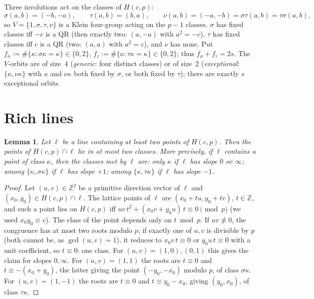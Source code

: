 \documentclass[11pt]{article}
\newtheorem{lemma}[theorem]{Lemma}
\theoremstyle{remark}
\newcommand{\Z}{\mathbb{Z}}
\newcommand{\Hc}{H(c,p)}
\begin{document}
Three involutions act on the classes of $\Hc$:
\[
 \sigma(a,b)=(-b,-a),\qquad \tau(a,b)=(b,a),\qquad \nu(a,b)=(-a,-b)=\sigma\tau(a,b)=\tau\sigma(a,b),
\]
so $V=\{1,\sigma,\tau,\nu\}$ is a Klein four-group acting on the $p-1$ classes.  $\sigma$ has fixed classes iff $-c$ is a
QR (then exactly two: $(a,-a)$ with $a^2=-c$), $\tau$ has fixed classes iff $c$ is a QR (two: $(a,a)$ with $a^2=c$),
and $\nu$ has none.  Put $f_\sigma:=\#\{\kappa:\sigma\kappa=\kappa\}\in\{0,2\}$, $f_\tau:=\#\{\kappa:\tau\kappa=\kappa\}\in\{0,2\}$;
thus $f_\sigma+f_\tau=2s$.  The $V$-orbits are of size~4 (\emph{generic}: four distinct classes) or of size~2
(\emph{exceptional}: $\{\kappa,\nu\kappa\}$ with $\kappa$ and $\nu\kappa$ both fixed by $\sigma$, or both fixed by $\tau$);
there are exactly $s$ exceptional orbits.

\section{Rich lines}

\begin{lemma}\label{lem:lagrange}
Let $\ell$ be a line containing at least two points of $\Hc$.  Then the points of $\Hc\cap\ell$ lie in at most two
classes.  More precisely, if $\ell$ contains a point of class $\kappa$, then the classes met by $\ell$ are:
only $\kappa$ if $\ell$ has slope $0$ or $\infty$; among $\{\kappa,\sigma\kappa\}$ if $\ell$ has slope $+1$;
among $\{\kappa,\tau\kappa\}$ if $\ell$ has slope $-1$.
\end{lemma}

\begin{proof}
Let $(u,v)\in\Z^2$ be a primitive direction vector of $\ell$ and $(x_0,y_0)\in\Hc\cap\ell$.  The lattice points of
$\ell$ are $(x_0+tu,y_0+tv)$, $t\in\Z$, and such a point lies on $\Hc$ iff
$uv\,t^2+(x_0v+y_0u)\,t\equiv0\pmod p$ (we used $x_0y_0\equiv c$).  The class of the point depends only on
$t\bmod p$.  If $uv\not\equiv0$, the congruence has at most two roots modulo $p$; if exactly one of $u,v$ is
divisible by $p$ (both cannot be, as $\gcd(u,v)=1$), it reduces to $x_0v\,t\equiv0$ or $y_0u\,t\equiv0$ with a unit
coefficient, so $t\equiv0$: one class.  For $(u,v)=(1,0),(0,1)$ this gives the claim for slopes $0,\infty$.
For $(u,v)=(1,1)$ the roots are $t\equiv0$ and $t\equiv-(x_0+y_0)$, the latter giving the point
$(-y_0,-x_0)$ modulo $p$, of class $\sigma\kappa$.  For $(u,v)=(1,-1)$ the roots are $t\equiv0$ and
$t\equiv y_0-x_0$, giving $(y_0,x_0)$, of class $\tau\kappa$.
\end{proof}
\end{document}
